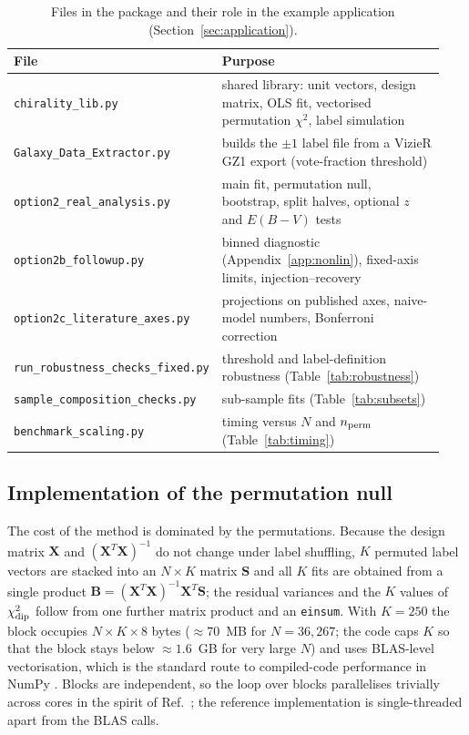 \documentclass[preprint,12pt]{elsarticle}
\begin{document}
\begin{table}[t]
\caption{\label{tab:files}Files in the package and their role in the example application (Section~\ref{sec:application}).}
\centering
\small
\begin{tabular}{p{0.34\linewidth}p{0.6\linewidth}}
\toprule
File & Purpose\\
\midrule
\texttt{chirality\_lib.py} & shared library: unit vectors, design matrix, OLS fit, vectorised permutation $\chi^2$, label simulation\\
\texttt{Galaxy\_Data\_Extractor.py} & builds the $\pm1$ label file from a VizieR GZ1 export (vote-fraction threshold)\\
\texttt{option2\_real\_analysis.py} & main fit, permutation null, bootstrap, split halves, optional $z$ and $E(B{-}V)$ tests\\
\texttt{option2b\_followup.py} & binned diagnostic (Appendix~\ref{app:nonlin}), fixed-axis limits, injection--recovery\\
\texttt{option2c\_literature\_axes.py} & projections on published axes, naive-model numbers, Bonferroni correction\\
\texttt{run\_robustness\_checks\_fixed.py} & threshold and label-definition robustness (Table~\ref{tab:robustness})\\
\texttt{sample\_composition\_checks.py} & sub-sample fits (Table~\ref{tab:subsets})\\
\texttt{benchmark\_scaling.py} & timing versus $N$ and $n_{\rm perm}$ (Table~\ref{tab:timing})\\
\bottomrule
\end{tabular}
\end{table}

\subsection{Implementation of the permutation null}

The cost of the method is dominated by the permutations.
Because the design matrix $\mathbf X$ and $(\mathbf X^T\mathbf X)^{-1}$ do not change under label shuffling, $K$ permuted label vectors are stacked into an $N\times K$ matrix $\mathbf S$ and all $K$ fits are obtained from a single product $\mathbf B=(\mathbf X^T\mathbf X)^{-1}\mathbf X^T\mathbf S$; the residual variances and the $K$ values of $\chi^2_{\rm dip}$ follow from one further matrix product and an \texttt{einsum}.
With $K=250$ the block occupies $N\times K\times 8$ bytes ($\approx70$~MB for $N=36{,}267$; the code caps $K$ so that the block stays below $\approx1.6$~GB for very large $N$) and uses BLAS-level vectorisation, which is the standard route to compiled-code performance in NumPy \cite{Mortensen2016}.
Blocks are independent, so the loop over blocks parallelises trivially across cores in the spirit of Ref.~\cite{Mendes2003}; the reference implementation is single-threaded apart from the BLAS calls.
\end{document}
